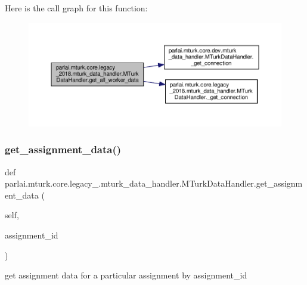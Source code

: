 Here is the call graph for this function\+:
\nopagebreak
\begin{figure}[H]
\begin{center}
\leavevmode
\includegraphics[width=350pt]{classparlai_1_1mturk_1_1core_1_1legacy__2018_1_1mturk__data__handler_1_1MTurkDataHandler_a3b340b130896aab223069d783566ce3e_cgraph}
\end{center}
\end{figure}
\mbox{\label{classparlai_1_1mturk_1_1core_1_1legacy__2018_1_1mturk__data__handler_1_1MTurkDataHandler_a31d6cd2577202bf2e6e4984a02f14f2a}} 
\subsubsection{\texorpdfstring{get\+\_\+assignment\+\_\+data()}{get\_assignment\_data()}}
{\footnotesize\ttfamily def parlai.\+mturk.\+core.\+legacy\+\_.\+mturk\+\_\+data\+\_\+handler.\+M\+Turk\+Data\+Handler.\+get\+\_\+assignment\+\_\+data (\begin{DoxyParamCaption}\item[{}]{self,  }\item[{}]{assignment\+\_\+id }\end{DoxyParamCaption})}

\begin{DoxyVerb}get assignment data for a particular assignment by assignment_id\end{DoxyVerb}
 

